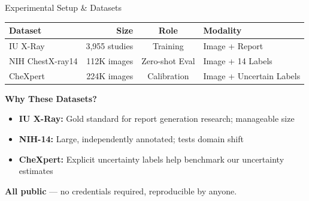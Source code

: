 \documentclass[aspectratio=169]{beamer}
\begin{document}
\begin{frame}{Experimental Setup \& Datasets}
  
  \begin{center}
    \begin{tabular}{lrcl}
      \toprule
      \textbf{Dataset} & \textbf{Size} & \textbf{Role} & \textbf{Modality} \\
      \midrule
      IU X-Ray & 3,955 studies & Training & Image + Report \\
      NIH ChestX-ray14 & 112K images & Zero-shot Eval & Image + 14 Labels \\
      CheXpert & 224K images & Calibration & Image + Uncertain Labels \\
      \bottomrule
    \end{tabular}
  \end{center}
  
  \vspace{0.5cm}
  
  \textbf{Why These Datasets?}
  \begin{itemize}
    \item \textbf{IU X-Ray:} Gold standard for report generation research; manageable size
    \item \textbf{NIH-14:} Large, independently annotated; tests domain shift
    \item \textbf{CheXpert:} Explicit uncertainty labels help benchmark our uncertainty estimates
  \end{itemize}
  
  \vspace{0.3cm}
  
  \textbf{All public} — no credentials required, reproducible by anyone.
  
\end{frame}
\end{document}
